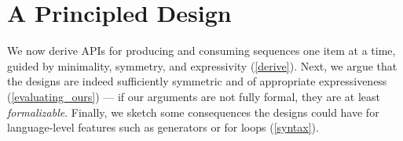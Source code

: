 \documentclass[sigplan,screen,10pt,review]{acmart}
\begin{document}





\section{A Principled Design}\label{main_design}

We now derive APIs for producing and consuming sequences one item at a time, guided by minimality, symmetry, and expressivity (\cref{derive}). Next, we argue that the designs are indeed sufficiently symmetric and of appropriate expressiveness (\cref{evaluating_ours}) --- if our arguments are not fully formal, they are at least \textit{formalizable}. Finally, we sketch some consequences the designs could have for language-level features such as generators or for loops (\cref{syntax}).
\end{document}
